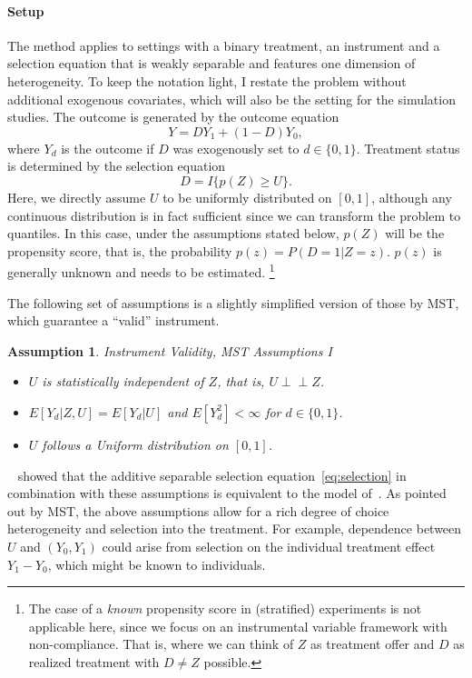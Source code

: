 \documentclass[12pt,a4paper,english]{article} %
\newcommand{\indep}{\perp\!\!\!\!\perp}
\numberwithin{equation}{section}
\theoremstyle{definition}
\theoremstyle{remark}
\theoremstyle{plain}
\newtheorem{assumption}{Assumption}
\begin{document}
\paragraph{Setup}
The method applies to settings with a binary treatment, an instrument and a selection equation that is weakly separable and features one dimension of heterogeneity.
To keep the notation light, I restate the problem without additional exogenous covariates, which will also be the setting for the simulation studies.
The outcome is generated by the outcome equation
\begin{equation}\label{eq:outcome}
  Y = DY_1 + (1-D) Y_0,
\end{equation}
where $Y_d$ is the outcome if $D$ was exogenously set to $d\in\{0,1\}$.
Treatment status is determined by the selection equation
\begin{equation}\label{eq:selection}
  D = I\{p(Z) \geq U\}.
\end{equation}
Here, we directly assume $U$ to be uniformly distributed on $[0,1]$, although any continuous distribution is in fact sufficient since we can transform the problem to quantiles.
In this case, under the assumptions stated below, $p(Z)$ will be the propensity score, that is, the probability $p(z) = P(D=1|Z=z)$.
$p(z)$ is generally unknown and needs to be estimated.
\footnote{The case of a \textit{known} propensity score in (stratified) experiments is not applicable here, since we focus on an instrumental variable framework with non-compliance.
That is, where we can think of $Z$ as treatment offer and $D$ as realized treatment with $D\neq Z$ possible.}

The following set of assumptions is a slightly simplified version of those by MST, which guarantee a ``valid'' instrument.

\begin{assumption}{Instrument Validity, MST Assumptions I}
\begin{itemize}
  \item[1.1] $U$ is statistically independent of $Z$, that is, $U \indep Z$.
  \item[1.2] $E[Y_d|Z,U] = E[Y_d|U]$ and $E[Y_d^2]<\infty$ for $d\in\{0,1\}$.
  \item[1.3] $U$ follows a Uniform distribution on $[0,1]$.
\end{itemize}
\end{assumption}
~\cite{vytlacil2002independence} showed that the additive separable selection equation~\ref{eq:selection} in combination with these assumptions is equivalent to the model of~\cite{imbens_angrist1994ecma}.
As pointed out by MST, the above assumptions allow for a rich degree of choice heterogeneity and selection into the treatment.
For example, dependence between $U$ and $(Y_0, Y_1)$ could arise from selection on the individual treatment effect $Y_1-Y_0$, which might be known to individuals.
\end{document}
